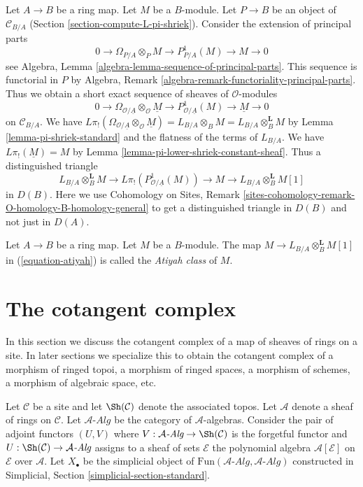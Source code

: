 \noindent
Let $A \to B$ be a ring map. Let $M$ be a $B$-module.
Let $P \to B$ be an object of $\mathcal{C}_{B/A}$
(Section \ref{section-compute-L-pi-shriek}).
Consider the extension of principal parts
$$
0 \to \Omega_{P/A} \otimes_P M \to P^1_{P/A}(M) \to M \to 0
$$
see Algebra, Lemma \ref{algebra-lemma-sequence-of-principal-parts}.
This sequence is functorial in $P$ by
Algebra, Remark \ref{algebra-remark-functoriality-principal-parts}.
Thus we obtain a short exact sequence of sheaves of $\mathcal{O}$-modules
$$
0 \to \Omega_{\mathcal{O}/\underline{A}} \otimes_\mathcal{O} \underline{M} \to
P^1_{\mathcal{O}/\underline{A}}(M) \to \underline{M} \to 0
$$
on $\mathcal{C}_{B/A}$. We have
$L\pi_!(\Omega_{\mathcal{O}/\underline{A}} \otimes_\mathcal{O} \underline{M})
= L_{B/A} \otimes_B M = L_{B/A} \otimes_B^\mathbf{L} M$
by Lemma \ref{lemma-pi-shriek-standard} and the flatness of
the terms of $L_{B/A}$.
We have $L\pi_!(\underline{M}) = M$ by
Lemma \ref{lemma-pi-lower-shriek-constant-sheaf}.
Thus a distinguished triangle
\begin{equation}
\label{equation-atiyah}
L_{B/A} \otimes_B^\mathbf{L} M \to
L\pi_!\left(P^1_{\mathcal{O}/\underline{A}}(M)\right) \to M
\to L_{B/A} \otimes_B^\mathbf{L} M [1]
\end{equation}
in $D(B)$. Here we use Cohomology on Sites, Remark
\ref{sites-cohomology-remark-O-homology-B-homology-general}
to get a distinguished triangle in $D(B)$ and not just in $D(A)$.

\begin{definition}
\label{definition-atiyah-class}
Let $A \to B$ be a ring map. Let $M$ be a $B$-module.
The map $M \to L_{B/A} \otimes_B^\mathbf{L} M[1]$
in (\ref{equation-atiyah}) is called the {\it Atiyah class} of $M$.
\end{definition}




\section{The cotangent complex}
\label{section-cotangent-complex}

\noindent
In this section we discuss the cotangent complex of a map of sheaves
of rings on a site. In later sections we specialize this to obtain
the cotangent complex of a morphism of ringed topoi, a morphism of
ringed spaces, a morphism of schemes, a morphism of algebraic space, etc.

\medskip\noindent
Let $\mathcal{C}$ be a site and let $\Sh(\mathcal{C})$ denote the
associated topos. Let $\mathcal{A}$ denote a sheaf of rings
on $\mathcal{C}$. Let $\mathcal{A}\textit{-Alg}$ be the category of
$\mathcal{A}$-algebras. Consider the pair of adjoint functors $(U, V)$ where
$V : \mathcal{A}\textit{-Alg} \to \Sh(\mathcal{C})$ is the forgetful functor and
$U : \Sh(\mathcal{C}) \to \mathcal{A}\textit{-Alg}$ assigns to a sheaf of sets
$\mathcal{E}$ the polynomial algebra $\mathcal{A}[\mathcal{E}]$ on
$\mathcal{E}$ over $\mathcal{A}$.
Let $X_\bullet$ be the simplicial object of
$\text{Fun}(\mathcal{A}\textit{-Alg}, \mathcal{A}\textit{-Alg})$
constructed in
Simplicial, Section \ref{simplicial-section-standard}.

